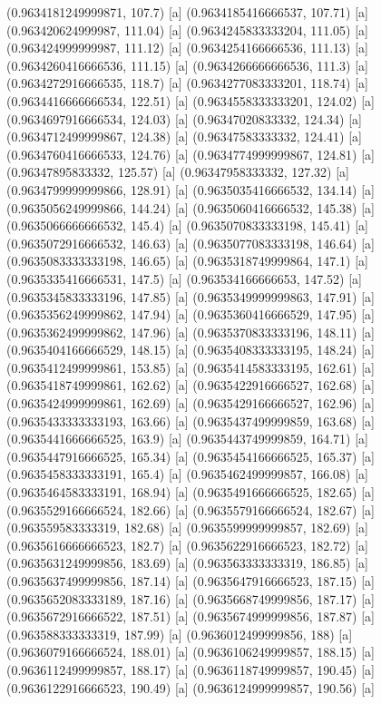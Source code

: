 {{{(0.9634181249999871, 107.7) [a] 
(0.9634185416666537, 107.71) [a] 
(0.963420624999987, 111.04) [a] 
(0.9634245833333204, 111.05) [a] 
(0.963424999999987, 111.12) [a] 
(0.9634254166666536, 111.13) [a] 
(0.9634260416666536, 111.15) [a] 
(0.9634266666666536, 111.3) [a] 
(0.9634272916666535, 118.7) [a] 
(0.9634277083333201, 118.74) [a] 
(0.9634416666666534, 122.51) [a] 
(0.9634558333333201, 124.02) [a] 
(0.9634697916666534, 124.03) [a] 
(0.96347020833332, 124.34) [a] 
(0.9634712499999867, 124.38) [a] 
(0.96347583333332, 124.41) [a] 
(0.9634760416666533, 124.76) [a] 
(0.9634774999999867, 124.81) [a] 
(0.96347895833332, 125.57) [a] 
(0.96347958333332, 127.32) [a] 
(0.9634799999999866, 128.91) [a] 
(0.9635035416666532, 134.14) [a] 
(0.9635056249999866, 144.24) [a] 
(0.9635060416666532, 145.38) [a] 
(0.9635066666666532, 145.4) [a] 
(0.9635070833333198, 145.41) [a] 
(0.9635072916666532, 146.63) [a] 
(0.9635077083333198, 146.64) [a] 
(0.9635083333333198, 146.65) [a] 
(0.9635318749999864, 147.1) [a] 
(0.9635335416666531, 147.5) [a] 
(0.963534166666653, 147.52) [a] 
(0.9635345833333196, 147.85) [a] 
(0.9635349999999863, 147.91) [a] 
(0.9635356249999862, 147.94) [a] 
(0.9635360416666529, 147.95) [a] 
(0.9635362499999862, 147.96) [a] 
(0.9635370833333196, 148.11) [a] 
(0.9635404166666529, 148.15) [a] 
(0.9635408333333195, 148.24) [a] 
(0.9635412499999861, 153.85) [a] 
(0.9635414583333195, 162.61) [a] 
(0.9635418749999861, 162.62) [a] 
(0.9635422916666527, 162.68) [a] 
(0.9635424999999861, 162.69) [a] 
(0.9635429166666527, 162.96) [a] 
(0.9635433333333193, 163.66) [a] 
(0.9635437499999859, 163.68) [a] 
(0.9635441666666525, 163.9) [a] 
(0.9635443749999859, 164.71) [a] 
(0.9635447916666525, 165.34) [a] 
(0.9635454166666525, 165.37) [a] 
(0.9635458333333191, 165.4) [a] 
(0.9635462499999857, 166.08) [a] 
(0.9635464583333191, 168.94) [a] 
(0.9635491666666525, 182.65) [a] 
(0.9635529166666524, 182.66) [a] 
(0.9635579166666524, 182.67) [a] 
(0.963559583333319, 182.68) [a] 
(0.9635599999999857, 182.69) [a] 
(0.9635616666666523, 182.7) [a] 
(0.9635622916666523, 182.72) [a] 
(0.9635631249999856, 183.69) [a] 
(0.963563333333319, 186.85) [a] 
(0.9635637499999856, 187.14) [a] 
(0.9635647916666523, 187.15) [a] 
(0.9635652083333189, 187.16) [a] 
(0.9635668749999856, 187.17) [a] 
(0.9635672916666522, 187.51) [a] 
(0.9635674999999856, 187.87) [a] 
(0.963588333333319, 187.99) [a] 
(0.9636012499999856, 188) [a] 
(0.9636079166666524, 188.01) [a] 
(0.9636106249999857, 188.15) [a] 
(0.9636112499999857, 188.17) [a] 
(0.9636118749999857, 190.45) [a] 
(0.9636122916666523, 190.49) [a] 
(0.9636124999999857, 190.56) [a] 
}}}
